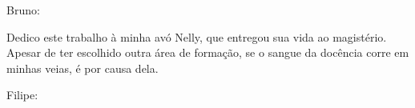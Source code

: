 Bruno:

Dedico este trabalho à minha avó Nelly, que entregou sua vida ao magistério. Apesar de ter escolhido outra área de formação, se o sangue da docência corre em minhas veias, é por causa dela.

\vspace*{3\baselineskip}

Filipe:

